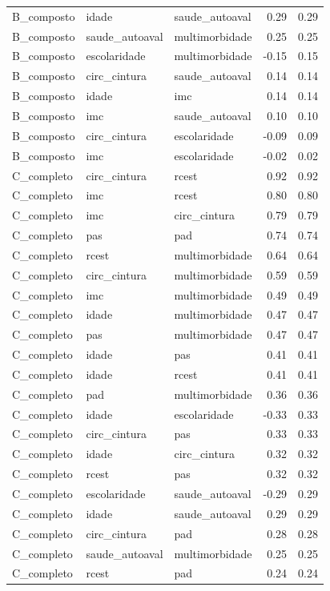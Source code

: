 \begin{tabular}{lllrr}
B_composto & idade & saude_autoaval & 0.29 & 0.29 \\
B_composto & saude_autoaval & multimorbidade & 0.25 & 0.25 \\
B_composto & escolaridade & multimorbidade & -0.15 & 0.15 \\
B_composto & circ_cintura & saude_autoaval & 0.14 & 0.14 \\
B_composto & idade & imc & 0.14 & 0.14 \\
B_composto & imc & saude_autoaval & 0.10 & 0.10 \\
B_composto & circ_cintura & escolaridade & -0.09 & 0.09 \\
B_composto & imc & escolaridade & -0.02 & 0.02 \\
C_completo & circ_cintura & rcest & 0.92 & 0.92 \\
C_completo & imc & rcest & 0.80 & 0.80 \\
C_completo & imc & circ_cintura & 0.79 & 0.79 \\
C_completo & pas & pad & 0.74 & 0.74 \\
C_completo & rcest & multimorbidade & 0.64 & 0.64 \\
C_completo & circ_cintura & multimorbidade & 0.59 & 0.59 \\
C_completo & imc & multimorbidade & 0.49 & 0.49 \\
C_completo & idade & multimorbidade & 0.47 & 0.47 \\
C_completo & pas & multimorbidade & 0.47 & 0.47 \\
C_completo & idade & pas & 0.41 & 0.41 \\
C_completo & idade & rcest & 0.41 & 0.41 \\
C_completo & pad & multimorbidade & 0.36 & 0.36 \\
C_completo & idade & escolaridade & -0.33 & 0.33 \\
C_completo & circ_cintura & pas & 0.33 & 0.33 \\
C_completo & idade & circ_cintura & 0.32 & 0.32 \\
C_completo & rcest & pas & 0.32 & 0.32 \\
C_completo & escolaridade & saude_autoaval & -0.29 & 0.29 \\
C_completo & idade & saude_autoaval & 0.29 & 0.29 \\
C_completo & circ_cintura & pad & 0.28 & 0.28 \\
C_completo & saude_autoaval & multimorbidade & 0.25 & 0.25 \\
C_completo & rcest & pad & 0.24 & 0.24 \\

\end{tabular}
